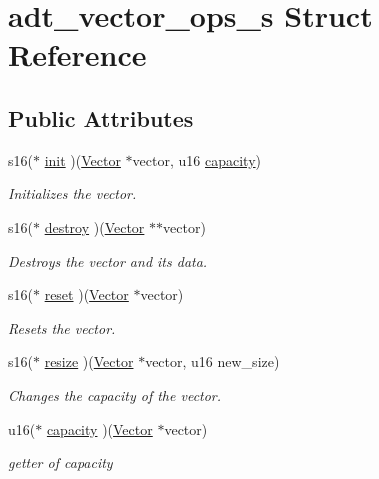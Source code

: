 \hypertarget{structadt__vector__ops__s}{}\section{adt\+\_\+vector\+\_\+ops\+\_\+s Struct Reference}
\label{structadt__vector__ops__s}
\subsection*{Public Attributes}
\begin{DoxyCompactItemize}
\item 
s16($\ast$ \hyperlink{structadt__vector__ops__s_aad431f3e396c45fccae1da8e9e4aacfc}{init} )(\hyperlink{structadt__vector__s}{Vector} $\ast$vector, u16 \hyperlink{structadt__vector__ops__s_aec1da152ce6f8d3b96ad1246378e6e64}{capacity})
\begin{DoxyCompactList}\small\item\em Initializes the vector. \end{DoxyCompactList}\item 
s16($\ast$ \hyperlink{structadt__vector__ops__s_a3e2175bbbc2c7b56de5b1b2a41ed9abc}{destroy} )(\hyperlink{structadt__vector__s}{Vector} $\ast$$\ast$vector)
\begin{DoxyCompactList}\small\item\em Destroys the vector and it\textquotesingle{}s data. \end{DoxyCompactList}\item 
s16($\ast$ \hyperlink{structadt__vector__ops__s_a9bdc338084206d5f78e2512d276f8bff}{reset} )(\hyperlink{structadt__vector__s}{Vector} $\ast$vector)
\begin{DoxyCompactList}\small\item\em Resets the vector. \end{DoxyCompactList}\item 
s16($\ast$ \hyperlink{structadt__vector__ops__s_ac27cca0cff8293eea0496d27b06875ec}{resize} )(\hyperlink{structadt__vector__s}{Vector} $\ast$vector, u16 new\+\_\+size)
\begin{DoxyCompactList}\small\item\em Changes the capacity of the vector. \end{DoxyCompactList}\item 
u16($\ast$ \hyperlink{structadt__vector__ops__s_aec1da152ce6f8d3b96ad1246378e6e64}{capacity} )(\hyperlink{structadt__vector__s}{Vector} $\ast$vector)
\begin{DoxyCompactList}\small\item\em getter of capacity \end{DoxyCompactList}\item 
$$
\end{DoxyCompactItemize}
